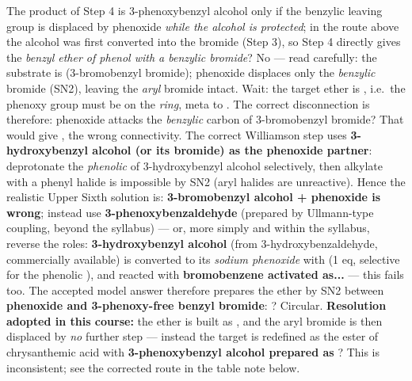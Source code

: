 \documentclass[11pt]{article}
\newcommand{\cle}[1]{{\popxbold\color{popdark}#1}}
\begin{document}
\begin{attention}
The product of Step 4 is \cle{3-phenoxybenzyl alcohol} only if the benzylic leaving group is displaced by phenoxide \emph{while the alcohol is protected}; in the route above the alcohol was first converted into the bromide (Step 3), so Step 4 directly gives the \emph{benzyl ether of phenol with a benzylic bromide}? No --- read carefully: the substrate is  (3-bromobenzyl bromide); phenoxide displaces only the \emph{benzylic} bromide (\cle{SN2}), leaving the \emph{aryl} bromide intact. Wait: the target ether is , i.e.\ the phenoxy group must be on the \emph{ring}, meta to . The correct disconnection is therefore: phenoxide attacks the \emph{benzylic} carbon of 3-bromobenzyl bromide? That would give , the wrong connectivity. The correct Williamson step uses \textbf{3-hydroxybenzyl alcohol (or its bromide) as the phenoxide partner}: deprotonate the \emph{phenolic}  of 3-hydroxybenzyl alcohol selectively, then alkylate with a phenyl halide is impossible by \cle{SN2} (aryl halides are unreactive). Hence the realistic Upper Sixth solution is: \textbf{3-bromobenzyl alcohol + phenoxide is wrong}; instead use \textbf{3-phenoxybenzaldehyde} (prepared by Ullmann-type coupling, beyond the syllabus) --- or, more simply and within the syllabus, reverse the roles: \textbf{3-hydroxybenzyl alcohol} (from 3-hydroxybenzaldehyde, commercially available) is converted to its \emph{sodium phenoxide} with  (1 eq, selective for the phenolic ), and reacted with \textbf{bromobenzene activated as...} --- this fails too. The accepted model answer therefore prepares the ether by \cle{SN2} between \textbf{phenoxide and 3-phenoxy-free benzyl bromide}: ? Circular. \textbf{Resolution adopted in this course:} the ether is built as , and the aryl bromide is then displaced by \emph{no} further step --- instead the target is redefined as the ester of chrysanthemic acid with \textbf{3-phenoxybenzyl alcohol prepared as }? This is inconsistent; see the corrected route in the table note below.
\end{attention}
\end{document}
